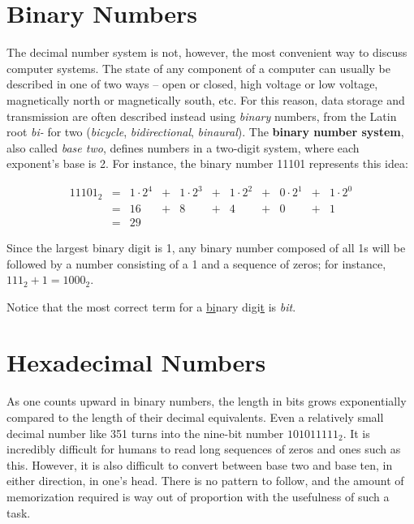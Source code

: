 \section{Binary Numbers}
The decimal number system is not, however, the most convenient way to discuss computer systems.  The state of any component of a computer can usually be described in one of two ways -- open or closed, high voltage or low voltage, magnetically north or magnetically south, etc.  For this reason, data storage and transmission are often described instead using \textit{binary} numbers, from the Latin root \textit{bi-} for two (\textit{bicycle}, \textit{bidirectional}, \textit{binaural}).  The \textbf{binary number system}, also called \textit{base two}, defines numbers in a two-digit system, where each exponent's base is 2.  For instance, the binary number 11101 represents this idea:

\begin{equation}
    \begin{array}{ccccccccccc}
    11101_2 &=& 1 \cdot 2^4 &+& 1 \cdot 2^3 &+& 1 \cdot 2^2 &+& 0 \cdot 2^1 &+& 1 \cdot 2^0\\
    &=& 16 &+& 8 &+& 4 &+& 0 &+& 1\\
    &=& 29
\end{array}
\end{equation}

Since the largest binary digit is 1, any binary number composed of all 1s will be followed by a number consisting of a 1 and a sequence of zeros; for instance, $111_2 + 1 = 1000_2$.

Notice that the most correct term for a \underline{bi}nary digi\underline{t} is \textit{bit}.

\setcounter{section}{15}
\section{Hexadecimal Numbers}

As one counts upward in binary numbers, the length in bits grows exponentially compared to the length of their decimal equivalents.  Even a relatively small decimal number like 351 turns into the nine-bit number $101011111_2$.  It is incredibly difficult for humans to read long sequences of zeros and ones such as this.  However, it is also difficult to convert between base two and base ten, in either direction, in one's head.  There is no pattern to follow, and the amount of memorization required is way out of proportion with the usefulness of such a task.

